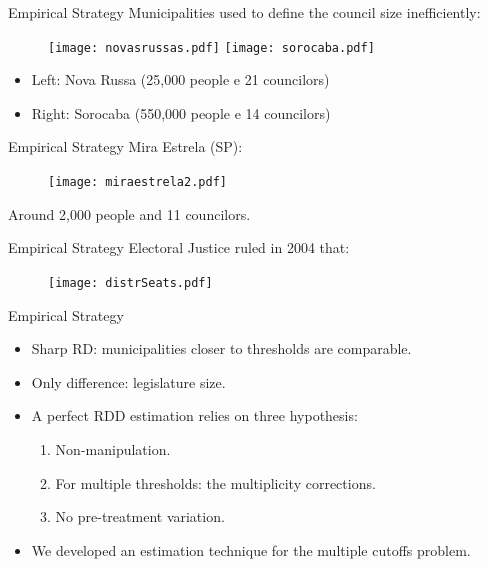 \documentclass[11pt]{beamer}
\begin{document}
\begin{frame}{Empirical Strategy}
Municipalities used to define the council size inefficiently:
\begin{figure}
   \texttt{[image: novasrussas.pdf]}
   \hfill
   \texttt{[image: sorocaba.pdf]}
\end{figure}
\begin{itemize} \itemsep1em
 \item Left: Nova Russa (25,000 people e 21 councilors)
 \item Right: Sorocaba (550,000 people e 14 councilors)
\end{itemize}
\end{frame}

\begin{frame}{Empirical Strategy}
Mira Estrela (SP):
  \begin{figure}[htb]
   \centering
   \texttt{[image: miraestrela2.pdf]}
  \end{figure}
  Around 2,000 people and 11 councilors.
\end{frame}

\begin{frame}{Empirical Strategy}
Electoral Justice ruled in 2004 that:
  \begin{figure}[htb]
   \centering
   \texttt{[image: distrSeats.pdf]}
  \end{figure}
\end{frame}

\begin{frame}{Empirical Strategy}
\begin{itemize} \itemsep1em
\item Sharp RD: municipalities closer to thresholds are comparable.
\item Only difference: legislature size.
\item A perfect RDD estimation relies on three hypothesis: 
\begin{enumerate} \itemsep1em
\item Non-manipulation.
\item For multiple thresholds: the multiplicity corrections.
\item No pre-treatment variation.
\end{enumerate}
\item We developed an estimation technique for the multiple cutoffs problem.
\end{itemize}
\end{frame}
\end{document}
